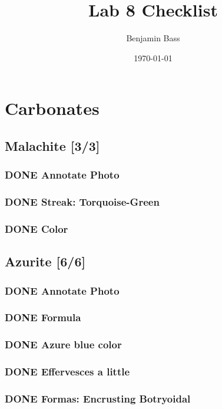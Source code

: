 \documentclass[11pt]{article}
\author{Benjamin Bass}
\date{\today}
\title{Lab 8 Checklist}
\begin{document}
\maketitle
\tableofcontents


\section{Carbonates}
\label{sec-1}
\subsection{Malachite [3/3]}
\label{sec-1-1}
\subsubsection{{\bfseries\sffamily DONE} Annotate Photo}
\label{sec-1-1-1}
\subsubsection{{\bfseries\sffamily DONE} Streak: Torquoise-Green}
\label{sec-1-1-2}
\subsubsection{{\bfseries\sffamily DONE} Color}
\label{sec-1-1-3}
\subsection{Azurite [6/6]}
\label{sec-1-2}
\subsubsection{{\bfseries\sffamily DONE} Annotate Photo}
\label{sec-1-2-1}
\subsubsection{{\bfseries\sffamily DONE} Formula}
\label{sec-1-2-2}
\subsubsection{{\bfseries\sffamily DONE} Azure blue color}
\label{sec-1-2-3}
\subsubsection{{\bfseries\sffamily DONE} Effervesces a little}
\label{sec-1-2-4}
\subsubsection{{\bfseries\sffamily DONE} Formas: Encrusting Botryoidal}
\label{sec-1-2-5}
\end{document}
